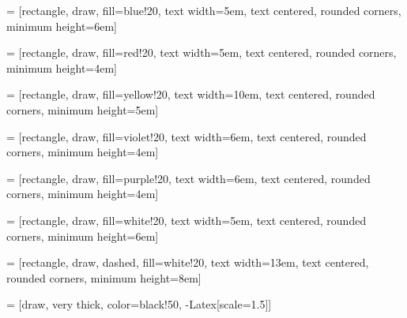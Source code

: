 
 = [rectangle, draw, fill=blue!20,
    text width=5em, text centered, rounded corners, minimum height=6em]
    
 = [rectangle, draw, fill=red!20,
    text width=5em, text centered, rounded corners, minimum height=4em]
    
 = [rectangle, draw, fill=yellow!20,
    text width=10em, text centered, rounded corners, minimum height=5em]
    
 = [rectangle, draw, fill=violet!20,
    text width=6em, text centered, rounded corners, minimum height=4em]
    
 = [rectangle, draw, fill=purple!20,
    text width=6em, text centered, rounded corners, minimum height=4em]
    
 = [rectangle, draw, fill=white!20,
    text width=5em, text centered, rounded corners, minimum height=6em]
    
 = [rectangle, draw, dashed, fill=white!20,
    text width=13em, text centered, rounded corners, minimum height=8em]
    
 = [draw, very thick, color=black!50, -{Latex[scale=1.5]}]


